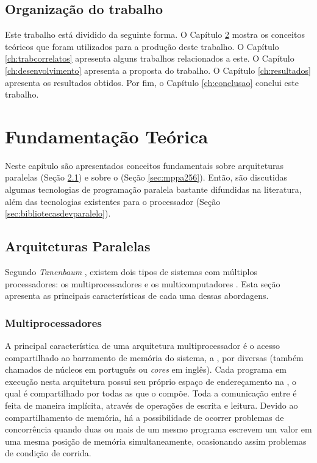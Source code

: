 \section{Organização do trabalho}

Este trabalho está dividido da seguinte forma. O Capítulo \ref{ch:fundamentacaoteorica} mostra os conceitos teóricos que foram utilizados para a produção deste trabalho. O Capítulo \ref{ch:trabcorrelatos} apresenta alguns trabalhos relacionados a este. O Capítulo \ref{ch:desenvolvimento} apresenta a proposta do trabalho. O Capítulo \ref{ch:resultados} apresenta os resultados obtidos. Por fim, o Capítulo \ref{ch:conclusao} conclui este trabalho.

\chapter{Fundamentação Teórica}
\label{ch:fundamentacaoteorica}

Neste capítulo são apresentados conceitos fundamentais sobre arquiteturas paralelas (Seção \ref{sec:arquiteturasparalelas}) e sobre o \mppa (Seção \ref{sec:mppa256}). Então, são discutidas algumas tecnologias de programação paralela bastante difundidas na literatura, além das tecnologias existentes para o processador \mppa (Seção \ref{sec:bibliotecasdevparalelo}).

\section{Arquiteturas Paralelas}
\label{sec:arquiteturasparalelas}

Segundo \textit{Tanenbaum} \etal, existem dois tipos de sistemas com múltiplos processadores: os multiprocessadores e os multicomputadores \cite{TanenbaumMordenOS}. Esta seção apresenta as principais características de cada uma dessas abordagens.

\subsection{Multiprocessadores}
\label{sec:multiprocessadores}

A principal característica de uma arquitetura multiprocessador é o acesso compartilhado ao barramento de memória do sistema, a \textit{\RAM}, por diversas \textit{\CPUs} (também chamados de núcleos em português ou \textit{cores} em inglês). Cada programa em execução nesta arquitetura possui seu próprio espaço de endereçamento na \RAM, o qual é compartilhado por todas as \threads que o compõe. Toda a comunicação entre \threads é feita de maneira implícita, através de operações de escrita e leitura. Devido ao compartilhamento de memória, há a possibilidade de ocorrer problemas de concorrência quando duas ou mais \threads de um mesmo programa escrevem um valor em uma mesma posição de memória simultaneamente, ocasionando assim problemas de condição de corrida.

